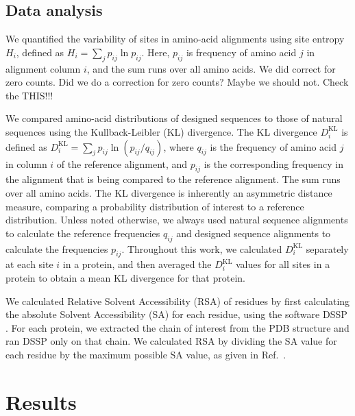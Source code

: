 \documentclass[12pt]{article}
\begin{document}
\subsection{Data analysis}

We quantified the variability of sites in amino-acid alignments using site entropy $H_i$, defined as $H_i=\sum_{j}p_{ij}\ln p_{ij}$. Here, $p_{ij}$ is frequency of amino acid $j$ in alignment column $i$, and the sum runs over all amino acids. {\color{red} We did correct for zero counts. Did we do a correction for zero counts? Maybe we should not. Check the THIS!!!}

We compared amino-acid distributions of designed sequences to those of natural sequences using the Kullback-Leibler (KL) divergence. The KL divergence $D^\text{KL}_i$ is defined as $D^\text{KL}_i= \sum_j  p_{ij} \ln  (p_{ij}/q_{ij})$, where $q_{ij}$ is the frequency of amino acid $j$ in column $i$ of the reference alignment, and $p_{ij}$ is the corresponding frequency in the alignment that is being compared to the reference alignment. The sum runs over all amino acids. The KL divergence is inherently an asymmetric distance measure, comparing a probability distribution of interest to a reference distribution. Unless noted otherwise, we always used natural sequence alignments to calculate the reference frequencies $q_{ij}$ and designed sequence alignments to calculate the frequencies $p_{ij}$. Throughout this work, we calculated $D^\text{KL}_i$ separately at each site $i$ in a protein, and then averaged the $D^\text{KL}_i$ values for all sites in a protein to obtain a mean KL divergence for that protein.

We calculated Relative Solvent Accessibility (RSA) of residues by first calculating the absolute Solvent Accessibility (SA) for each residue, using the software DSSP \cite{Kabsch1983}. For each protein, we extracted the chain of interest from the PDB structure and ran DSSP only on that chain. We calculated RSA by dividing the SA value for each residue by the maximum possible SA value, as given in Ref.\ \cite{Tien}. 

\section{Results}
\label{Results}
\end{document}
